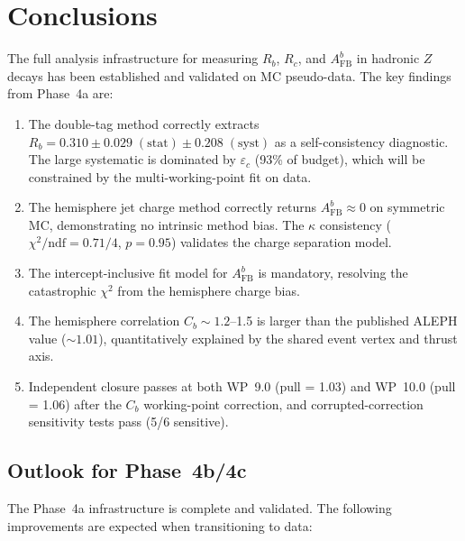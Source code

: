 \documentclass[11pt,a4paper]{article}
\begin{document}
\FloatBarrier
{}
\section{Conclusions}
\label{sec:conclusions}

The full analysis infrastructure for measuring $R_b$, $R_c$, and $A_\mathrm{FB}^b$ in
hadronic $Z$ decays has been established and validated on MC pseudo-data. The key
findings from Phase~4a are:

\begin{enumerate}
\item The double-tag method correctly extracts $R_b = 0.310 \pm 0.029\;\mathrm{(stat)}
\pm 0.208\;\mathrm{(syst)}$ as a self-consistency diagnostic. The large systematic
is dominated by $\varepsilon_c$ (93\% of budget), which will be constrained
by the multi-working-point fit on data.

\item The hemisphere jet charge method correctly returns $A_\mathrm{FB}^b \approx 0$
on symmetric MC, demonstrating no intrinsic method bias. The $\kappa$ consistency
($\chi^2/\mathrm{ndf} = 0.71/4$, $p = 0.95$) validates the charge separation model.

\item The intercept-inclusive fit model for $A_\mathrm{FB}^b$ is mandatory, resolving
the catastrophic $\chi^2$ from the hemisphere charge bias.

\item The hemisphere correlation $C_b \sim 1.2$--1.5 is larger than the published
ALEPH value ($\sim 1.01$), quantitatively explained by the shared event vertex
and thrust axis.

\item Independent closure passes at both WP~9.0 (pull = 1.03) and WP~10.0 (pull = 1.06)
after the $C_b$ working-point correction, and corrupted-correction
sensitivity tests pass (5/6 sensitive).
\end{enumerate}

\subsection{Outlook for Phase~4b/4c}
\label{sec:outlook}

The Phase~4a infrastructure is complete and validated. The following improvements are
expected when transitioning to data:
\end{document}
